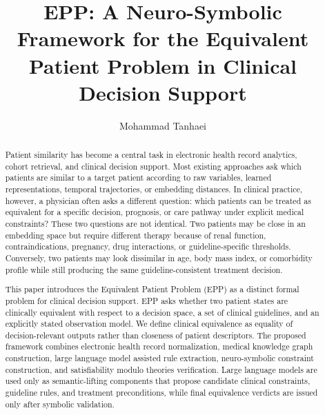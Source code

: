 \documentclass[english,5p,twocolumn,preprint]{elsarticle}
\begin{document}
\begin{frontmatter}

\title{EPP: A Neuro-Symbolic Framework for the Equivalent Patient Problem in Clinical Decision Support}

\author{Mohammad Tanhaei}
\address{Department of Engineering, Ilam University, Ilam, Iran}


\begin{abstract}
Patient similarity has become a central task in electronic health record analytics, cohort retrieval, and clinical decision support. Most existing approaches ask which patients are similar to a target patient according to raw variables, learned representations, temporal trajectories, or embedding distances. In clinical practice, however, a physician often asks a different question: which patients can be treated as equivalent for a specific decision, prognosis, or care pathway under explicit medical constraints? These two questions are not identical. Two patients may be close in an embedding space but require different therapy because of renal function, contraindications, pregnancy, drug interactions, or guideline-specific thresholds. Conversely, two patients may look dissimilar in age, body mass index, or comorbidity profile while still producing the same guideline-consistent treatment decision. 

This paper introduces the Equivalent Patient Problem (EPP) as a distinct formal problem for clinical decision support. EPP asks whether two patient states are clinically equivalent with respect to a decision space, a set of clinical guidelines, and an explicitly stated observation model. We define clinical equivalence as equality of decision-relevant outputs rather than closeness of patient descriptors. The proposed framework combines electronic health record normalization, medical knowledge graph construction, large language model assisted rule extraction, neuro-symbolic constraint construction, and satisfiability modulo theories verification. Large language models are used only as semantic-lifting components that propose candidate clinical constraints, guideline rules, and treatment preconditions, while final equivalence verdicts are issued only after symbolic validation. 


\end{abstract}
\end{frontmatter}
\end{document}
